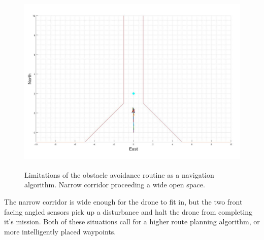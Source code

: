 		\begin{figure}[H]
			\centering
			\includegraphics[height = 9cm]{../References/Testing/Fail1.jpg} 
			\caption{Limitations of the obstacle avoidance routine as a navigation algorithm. Narrow corridor proceeding a wide open space.}
			\label{IM_Test52}
		\end{figure}
		
		The narrow corridor is wide enough for the drone to fit in, but the two front facing angled sensors pick up a disturbance and halt the drone from completing it's mission. Both of these situations call for a higher route planning algorithm, or more intelligently placed waypoints.
